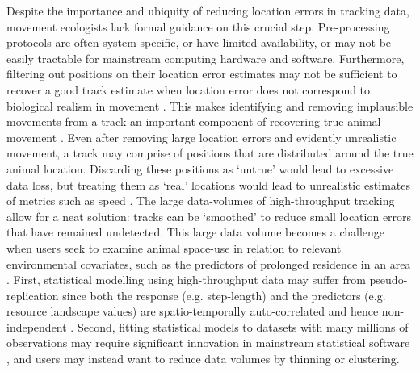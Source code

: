 \documentclass[10pt,paper=a4,headings=standardclasses
]{scrartcl}
\begin{document}
Despite the importance and ubiquity of reducing location errors in tracking data, movement ecologists lack formal guidance on this crucial step.
Pre-processing protocols are often system-specific, or have limited availability, or may not be easily tractable for mainstream computing hardware and software.
Furthermore, filtering out positions on their location error estimates may not be sufficient to recover a good track estimate when location error does not correspond to biological realism in movement \citep{weiser2016, ranacher2016}.
This makes identifying and removing implausible movements from a track an important component of recovering true animal movement \citep{bjorneraas2010}.
Even after removing large location errors and evidently unrealistic movement, a track may comprise of positions that are distributed around the true animal location.
Discarding these positions as `untrue' would lead to excessive data loss, but treating them as `real' locations would lead to unrealistic estimates of metrics such as speed \citep{noonan2019}.
The large data-volumes of high-throughput tracking allow for a neat solution: tracks can be `smoothed' to reduce small location errors that have remained undetected.
This large data volume becomes a challenge when users seek to examine animal space-use in relation to relevant environmental covariates, such as the predictors of prolonged residence in an area \citep[see][]{bracis2018}.
First, statistical modelling using high-throughput data may suffer from pseudo-replication since both the response (e.g. step-length) and the predictors (e.g. resource landscape values) are spatio-temporally auto-correlated and hence non-independent \citep{aarts2008, fleming2014a,bijleveld2016, oudman2018, harel2016}.
Second, fitting statistical models to datasets with many millions of observations may require significant innovation in mainstream statistical software \citep[e.g. ][]{wood2015}, and users may instead want to reduce data volumes by thinning or clustering.
\end{document}
